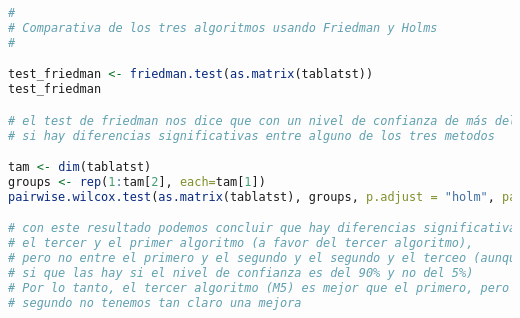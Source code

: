 \begin{lstlisting}[language=R]
#
# Comparativa de los tres algoritmos usando Friedman y Holms
#

test_friedman <- friedman.test(as.matrix(tablatst))
test_friedman

# el test de friedman nos dice que con un nivel de confianza de más del 98%,
# si hay diferencias significativas entre alguno de los tres metodos

tam <- dim(tablatst)
groups <- rep(1:tam[2], each=tam[1])
pairwise.wilcox.test(as.matrix(tablatst), groups, p.adjust = "holm", paired = TRUE)

# con este resultado podemos concluir que hay diferencias significativas entre
# el tercer y el primer algoritmo (a favor del tercer algoritmo),
# pero no entre el primero y el segundo y el segundo y el terceo (aunque con este último
# si que las hay si el nivel de confianza es del 90% y no del 5%)
# Por lo tanto, el tercer algoritmo (M5) es mejor que el primero, pero con el
# segundo no tenemos tan claro una mejora

\end{lstlisting}
